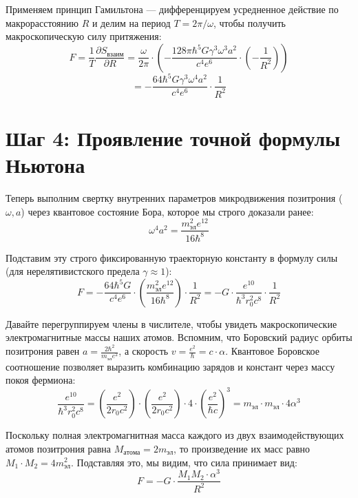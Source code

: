 \documentclass[12pt,a4paper]{article}
\begin{document}
Применяем принцип Гамильтона — дифференцируем усредненное действие по макрорасстоянию $R$ и делим на период $T = 2\pi/\omega$, чтобы получить макроскопическую силу притяжения:
\begin{equation}
F = \frac{1}{T} \frac{\partial S_{взаим}}{\partial R} = \frac{\omega}{2\pi} \cdot \left( - \frac{128 \pi \hbar^5 G \gamma^3 \omega^3 a^2}{c^4 e^6} \cdot \left(-\frac{1}{R^2}\right) \right)
\end{equation}
\begin{equation}
= - \frac{64 \hbar^5 G \gamma^3 \omega^4 a^2}{c^4 e^6} \cdot \frac{1}{R^2}
\end{equation}

\section*{Шаг 4: Проявление точной формулы Ньютона}

Теперь выполним свертку внутренних параметров микродвижения позитрония ($\omega, a$) через квантовое состояние Бора, которое мы строго доказали ранее:
\begin{equation}
\omega^4 a^2 = \frac{m_{эл}^2 e^{12}}{16 \hbar^8}
\end{equation}

Подставим эту строго фиксированную траекторную константу в формулу силы (для нерелятивистского предела $\gamma \approx 1$):
\begin{equation}
F = - \frac{64 \hbar^5 G}{c^4 e^6} \cdot \left( \frac{m_{эл}^2 e^{12}}{16 \hbar^8} \right) \cdot \frac{1}{R^2} = - G \cdot \frac{e^{10}}{\hbar^3 r_0^2 c^8} \cdot \frac{1}{R^2}
\end{equation}

Давайте перегруппируем члены в числителе, чтобы увидеть макроскопические электромагнитные массы наших атомов. Вспомним, что Боровский радиус орбиты позитрония равен $a = \frac{2\hbar^2}{m_{эл} e^2}$, а скорость $v = \frac{e^2}{\hbar} = c \cdot \alpha$. Квантовое Боровское соотношение позволяет выразить комбинацию зарядов и констант через массу покоя фермиона:
\begin{equation}
\frac{e^{10}}{\hbar^3 r_0^2 c^8} = \left( \frac{e^2}{2 r_0 c^2} \right) \cdot \left( \frac{e^2}{2 r_0 c^2} \right) \cdot 4 \cdot \left(\frac{e^2}{\hbar c}\right)^3 = m_{эл} \cdot m_{эл} \cdot 4 \alpha^3
\end{equation}

Поскольку полная электромагнитная масса каждого из двух взаимодействующих атомов позитрония равна $M_{атома} = 2m_{эл}$, то произведение их масс равно $M_1 \cdot M_2 = 4 m_{эл}^2$. Подставляя это, мы видим, что сила принимает вид:
\begin{equation}
F = - G \cdot \frac{M_1 M_2 \cdot \alpha^3}{R^2}
\end{equation}
\end{document}
